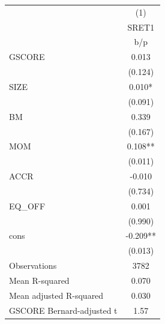 {
\def\sym#1{\ifmmode^{#1}\else\(^{#1}\)\fi}
\begin{tabular}{l*{1}{c}}
\hline\hline
                    &\multicolumn{1}{c}{(1)}\\
                    &\multicolumn{1}{c}{SRET1}\\
                    &         b/p   \\
\hline
GSCORE              &       0.013   \\
                    &     (0.124)   \\
SIZE                &       0.010*  \\
                    &     (0.091)   \\
BM                  &       0.339   \\
                    &     (0.167)   \\
MOM                 &       0.108** \\
                    &     (0.011)   \\
ACCR                &      -0.010   \\
                    &     (0.734)   \\
EQ\_OFF              &       0.001   \\
                    &     (0.990)   \\
cons                &      -0.209** \\
                    &     (0.013)   \\
\hline
Observations        &        3782   \\
Mean R-squared      &       0.070   \\
Mean adjusted R-squared&       0.030   \\
GSCORE Bernard-adjusted t&        1.57   \\
\hline\hline
\end{tabular}
}
